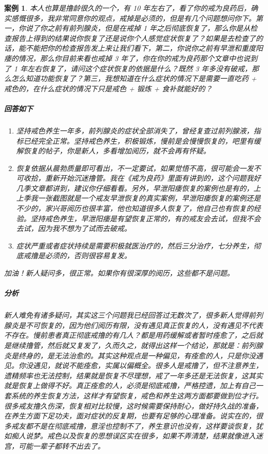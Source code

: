 \documentclass[fontset=founder]{ctexart}
\newtheorem{case}{案例}
\begin{document}
\begin{case}
    本人也算是撸龄很久的一个，有 10 年左右了，看了你的戒为良药后，确实感慨很多，我非常同意你的观点，戒掉是必须的，但是有几个问题想问你下。第一，你说了你之前有前列腺炎，但是在戒掉 1 年之后彻底恢复了，那么你是从检查报告上得到的结果说你恢复了还是说你个人感觉症状恢复了？如果是去检查了的话，能不能把你的检查报告发上来让我们看下，第二，你说你之前有早泄和重度阳痿的情况，那么你目前来看也戒掉 3 年了，你在你的戒为良药那个文章中也说到了 1 年左右恢复了，请问这个症状恢复的依据是什么？既然 3 年多没有破戒，那么怎么知道功能恢复了？第三，我想知道在什么症状的情况下是需要一直吃药 + 戒色的，在什么症状的情况下只是戒色 + 锻炼 + 食补就能好的？
    \subparagraph{回答如下} \begin{enumerate}
        \item 坚持戒色养生一年多，前列腺炎的症状全部消失了，曾经复查过前列腺液，指标已经完全正常。坚持戒色养生，积极锻炼，慢前是会慢慢恢复的，吧里有缓解恢复的帖子，你是新人，多看增加阅历，就不会再有怀疑。
        \item 恢复依据从晨勃质量即可看出，不一定要试，如果觉悟不高，很可能会一发不可收拾，重新开始沉迷撸管。我在《戒为良药》里面有讲到的，这个问题我好几季文章都讲到，建议你仔细看看。另外，早泄阳痿恢复的案例也是有的，上上季我一张截图就是一个戒友早泄恢复的真实案例，早泄阳痿恢复的案例还是不少的，家兴哥阅历也很丰富，他也知道很多人恢复了，他自己也有恢复的经验。坚持戒色养生，早泄阳痿是有望恢复正常的，有的戒友会去试，但我不会去试，因为我不想为了试而去破戒。
        \item 症状严重或者症状持续是需要积极就医治疗的，然后三分治疗，七分养生，彻底戒撸是必须的，否则很容易复发。
    \end{enumerate}
    加油！新人疑问多，很正常。如果你有很深厚的阅历，这些都不是问题。
    \subparagraph{分析} 新人难免有诸多疑问，其实这三个问题我已经回答过无数次了，很多新人觉得前列腺炎是不可恢复的，因为他们阅历有限，没有遇见真正恢复的人，没有遇见不代表不存在。慢前患者真正彻底戒撸的有几人？都是用药缓解或者暂时痊愈了，之后就是继续撸管，然后就又复发了，久而久之，就得出这样一个结论，那就是：前列腺炎是终身的，是无法治愈的。其实这种观点是一种偏见，有痊愈的人，只是你没遇见。你没遇见，就说不能痊愈，实属以偏概全。很多人是戒撸了，但不注意养生，遗精频率也无法控制，结果就是恢复不尽理想，戒了一年多还是无法恢复，这其实就是恢复上做得不好。真正痊愈的人，必须是彻底戒撸，严格控遗，加上有自己一套系统的养生恢复方法，这样才有望恢复，戒色和养生这两方面都要做到位才行。很多戒友撸久伤深，恢复相对比较慢，这时候需要保持耐心，做好持久战的准备，在养生方面下足功夫，面对症状的反复期，也要有足够的心理准备。说实在的，很多戒友都不是在彻底戒撸，意淫也控制不了，养生意识也没有，这样要谈恢复，犹如痴人说梦。戒色以及恢复的思想误区实在很多，如果不弄清楚，结果就像进入迷宫，可能一辈子都转不出去了。\\

\end{case}
\end{document}
